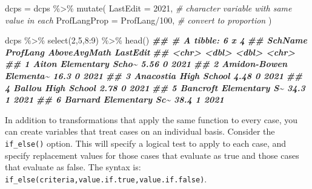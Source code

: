 \documentclass[
  12pt,
]{krantz}
\newenvironment{Shaded}{\begin{snugshade}}{\end{snugshade}}
\newcommand{\AttributeTok}[1]{\textcolor[rgb]{0.77,0.63,0.00}{#1}}
\newcommand{\CommentTok}[1]{\textcolor[rgb]{0.56,0.35,0.01}{\textit{#1}}}
\newcommand{\DecValTok}[1]{\textcolor[rgb]{0.00,0.00,0.81}{#1}}
\newcommand{\DocumentationTok}[1]{\textcolor[rgb]{0.56,0.35,0.01}{\textbf{\textit{#1}}}}
\newcommand{\FunctionTok}[1]{\textcolor[rgb]{0.00,0.00,0.00}{#1}}
\newcommand{\NormalTok}[1]{#1}
\newcommand{\OtherTok}[1]{\textcolor[rgb]{0.56,0.35,0.01}{#1}}
\newcommand{\SpecialCharTok}[1]{\textcolor[rgb]{0.00,0.00,0.00}{#1}}
\newcommand{\StringTok}[1]{\textcolor[rgb]{0.31,0.60,0.02}{#1}}
\begin{document}
\begin{Shaded}
\begin{Highlighting}[]
\NormalTok{  dcps }\OtherTok{=}
\NormalTok{    dcps }\SpecialCharTok{\%\textgreater{}\%}
    \FunctionTok{mutate}\NormalTok{(}
      \AttributeTok{LastEdit =} \StringTok{\textquotesingle{}2021\textquotesingle{}}\NormalTok{,  }\CommentTok{\# character variable with same value in each}
      \AttributeTok{ProfLangProp =}\NormalTok{ ProfLang}\SpecialCharTok{/}\DecValTok{100}\NormalTok{, }\CommentTok{\# convert to proportion}
\NormalTok{    )}
  
\NormalTok{  dcps }\SpecialCharTok{\%\textgreater{}\%} \FunctionTok{select}\NormalTok{(}\DecValTok{2}\NormalTok{,}\DecValTok{5}\NormalTok{,}\DecValTok{8}\SpecialCharTok{:}\DecValTok{9}\NormalTok{) }\SpecialCharTok{\%\textgreater{}\%} \FunctionTok{head}\NormalTok{()}
\DocumentationTok{\#\# \# A tibble: 6 x 4}
\DocumentationTok{\#\#   SchName                ProfLang AboveAvgMath LastEdit}
\DocumentationTok{\#\#   \textless{}chr\textgreater{}                     \textless{}dbl\textgreater{}        \textless{}dbl\textgreater{} \textless{}chr\textgreater{}   }
\DocumentationTok{\#\# 1 Aiton Elementary Scho\textasciitilde{}     5.56            0 2021    }
\DocumentationTok{\#\# 2 Amidon{-}Bowen Elementa\textasciitilde{}    16.3             0 2021    }
\DocumentationTok{\#\# 3 Anacostia High School      4.48            0 2021    }
\DocumentationTok{\#\# 4 Ballou High School         2.78            0 2021    }
\DocumentationTok{\#\# 5 Bancroft Elementary S\textasciitilde{}    34.3             1 2021    }
\DocumentationTok{\#\# 6 Barnard Elementary Sc\textasciitilde{}    38.4             1 2021}
\end{Highlighting}
\end{Shaded}

In addition to transformations that apply the same function to every case, you can create variables that treat cases on an individual basis. Consider the \texttt{if\_else()} option. This will specify a logical test to apply to each case, and specify replacement values for those cases that evaluate as true and those cases that evaluate as false. The syntax is: \texttt{if\_else(criteria,value.if.true,value.if.false)}.
\end{document}
